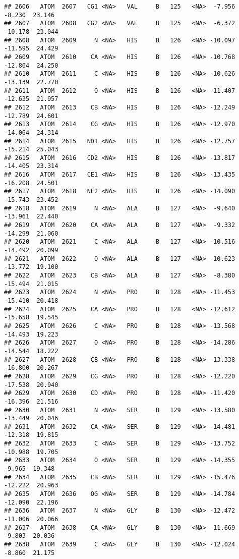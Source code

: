\documentclass[
]{article}
\begin{document}
\begin{verbatim}
## 2606   ATOM  2607   CG1 <NA>   VAL     B   125   <NA>  -7.956  -8.230  23.146
## 2607   ATOM  2608   CG2 <NA>   VAL     B   125   <NA>  -6.372 -10.178  23.044
## 2608   ATOM  2609     N <NA>   HIS     B   126   <NA> -10.097 -11.595  24.429
## 2609   ATOM  2610    CA <NA>   HIS     B   126   <NA> -10.768 -12.864  24.250
## 2610   ATOM  2611     C <NA>   HIS     B   126   <NA> -10.626 -13.139  22.770
## 2611   ATOM  2612     O <NA>   HIS     B   126   <NA> -11.407 -12.635  21.957
## 2612   ATOM  2613    CB <NA>   HIS     B   126   <NA> -12.249 -12.789  24.601
## 2613   ATOM  2614    CG <NA>   HIS     B   126   <NA> -12.970 -14.064  24.314
## 2614   ATOM  2615   ND1 <NA>   HIS     B   126   <NA> -12.757 -15.214  25.043
## 2615   ATOM  2616   CD2 <NA>   HIS     B   126   <NA> -13.817 -14.405  23.314
## 2616   ATOM  2617   CE1 <NA>   HIS     B   126   <NA> -13.435 -16.208  24.501
## 2617   ATOM  2618   NE2 <NA>   HIS     B   126   <NA> -14.090 -15.743  23.452
## 2618   ATOM  2619     N <NA>   ALA     B   127   <NA>  -9.640 -13.961  22.440
## 2619   ATOM  2620    CA <NA>   ALA     B   127   <NA>  -9.332 -14.299  21.060
## 2620   ATOM  2621     C <NA>   ALA     B   127   <NA> -10.516 -14.492  20.099
## 2621   ATOM  2622     O <NA>   ALA     B   127   <NA> -10.623 -13.772  19.100
## 2622   ATOM  2623    CB <NA>   ALA     B   127   <NA>  -8.380 -15.494  21.015
## 2623   ATOM  2624     N <NA>   PRO     B   128   <NA> -11.453 -15.410  20.418
## 2624   ATOM  2625    CA <NA>   PRO     B   128   <NA> -12.612 -15.658  19.545
## 2625   ATOM  2626     C <NA>   PRO     B   128   <NA> -13.568 -14.493  19.223
## 2626   ATOM  2627     O <NA>   PRO     B   128   <NA> -14.286 -14.544  18.222
## 2627   ATOM  2628    CB <NA>   PRO     B   128   <NA> -13.338 -16.800  20.267
## 2628   ATOM  2629    CG <NA>   PRO     B   128   <NA> -12.220 -17.538  20.940
## 2629   ATOM  2630    CD <NA>   PRO     B   128   <NA> -11.420 -16.396  21.516
## 2630   ATOM  2631     N <NA>   SER     B   129   <NA> -13.580 -13.449  20.046
## 2631   ATOM  2632    CA <NA>   SER     B   129   <NA> -14.481 -12.318  19.815
## 2632   ATOM  2633     C <NA>   SER     B   129   <NA> -13.752 -10.988  19.705
## 2633   ATOM  2634     O <NA>   SER     B   129   <NA> -14.355  -9.965  19.348
## 2634   ATOM  2635    CB <NA>   SER     B   129   <NA> -15.476 -12.222  20.963
## 2635   ATOM  2636    OG <NA>   SER     B   129   <NA> -14.784 -12.090  22.196
## 2636   ATOM  2637     N <NA>   GLY     B   130   <NA> -12.472 -11.006  20.066
## 2637   ATOM  2638    CA <NA>   GLY     B   130   <NA> -11.669  -9.803  20.036
## 2638   ATOM  2639     C <NA>   GLY     B   130   <NA> -12.024  -8.860  21.175

\end{verbatim}
\end{document}
